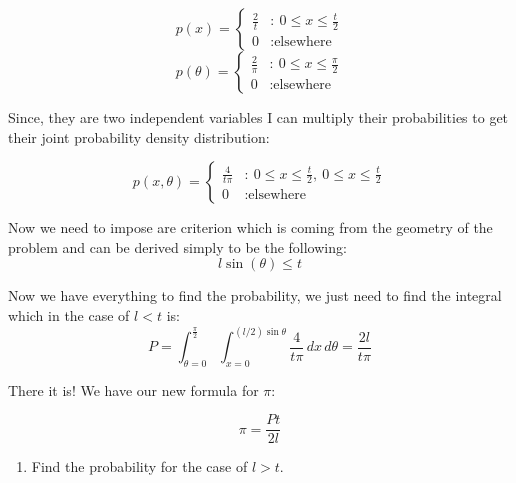 \documentclass[12pt,letterpaper]{article}
\begin{document}
\begin{multicols}{2}
\noindent
\begin{equation*}
 p(x) = \begin{cases}
 \frac{2}{t} &:\ 0 \le x \le \frac{t}{2}\\
 0 &: \text{elsewhere}
 \end{cases}
\end{equation*}
\begin{equation*}
p(\theta)=
\begin{cases}
\frac{2}{\pi} &:\ 0 \le x \le \frac{\pi}{2}\\
0 &: \text{elsewhere}
\end{cases}
\end{equation*}
\end{multicols}

Since, they are two independent variables I can multiply their probabilities to get their joint probability density distribution: 

\begin{equation*}
p(x,\theta)=
\begin{cases}
\frac{4}{t\pi} &:\ 0 \le x \le \frac{t}{2} , \ 0 \le x \le \frac{t}{2}\\
 0 &: \text{elsewhere}
\end{cases}
\end{equation*}

Now we need to impose are criterion which is coming from the geometry of the problem and can be derived simply to be the following:
\begin{equation*}
l \sin(\theta) \leq t
\end{equation*}

Now we have everything to find the probability, we just need to find the integral which in the case of $l<t$ is:
\begin{equation*}
 P=\int _{\theta =0}^{\frac {\pi }{2}}\int _{x=0}^{(l/2)\sin \theta }{\frac {4}{t\pi }}\,dx\,d\theta ={\frac {2l}{t\pi }}
\end{equation*}

There it is! We have our new formula for $\pi$:

\begin{equation*}
\pi = \frac{Pt}{2l}
\end{equation*}

\begin{enumerate}
\item Find the probability for the case of $l>t$.
\end{enumerate}
\end{document}
